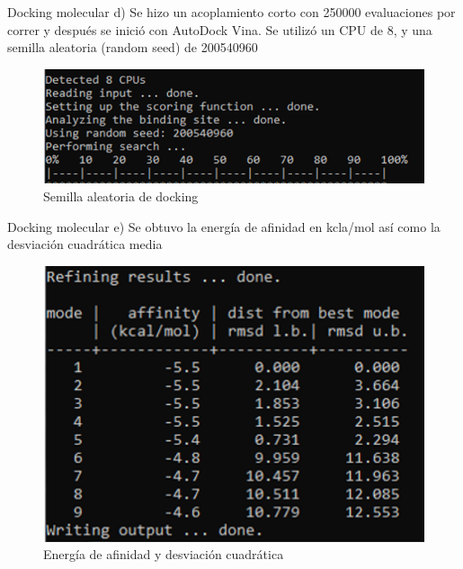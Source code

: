 \documentclass[11pt]{beamer}
\begin{document}
				\begin{frame}{Docking molecular}
			\justifying 
				d) Se hizo un acoplamiento corto con 250000 evaluaciones por correr y después se inició con AutoDock Vina. Se utilizó un CPU de 8, y una semilla aleatoria (random seed) de 200540960 
			
			\begin{figure}[H]
				\centering
				\includegraphics[scale=0.5]{semilla.png}
				\caption{Semilla aleatoria de docking}
				\label{fig: Figura1}
			\end{figure}
		\end{frame} 
			
				\begin{frame}{Docking molecular}
			\justifying 
				e) Se obtuvo la energía de afinidad en kcla/mol así como la desviación cuadrática media 
			
			\begin{figure}[H]
				\centering
				\includegraphics[scale=0.5]{afinidad.png}
				\caption{Energía de afinidad y desviación cuadrática}
				\label{fig: Figura1}
			\end{figure}
		\end{frame} 
			
\end{document}
